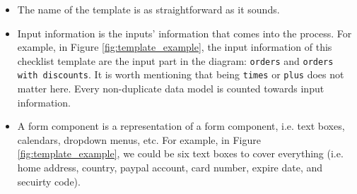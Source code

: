\begin{itemize}
    \item The name of the template is as straightforward as it sounds.
    \item Input information is the inputs' information that comes into the process.
    For example, in Figure \ref{fig:template_example}, the input information of this checklist template are the input part in the diagram: \verb!orders! and \verb!orders with discounts!. It is worth mentioning that being \verb!times! or \verb!plus! does not matter here. Every non-duplicate data model is counted towards input information.
    \item A form component is a representation of a form component, i.e. text boxes, calendars, dropdown menus, etc. For example, in Figure \ref{fig:template_example}, we could be six text boxes to cover everything (i.e. home address, country, paypal account, card number, expire date, and secuirty code).
\end{itemize}




